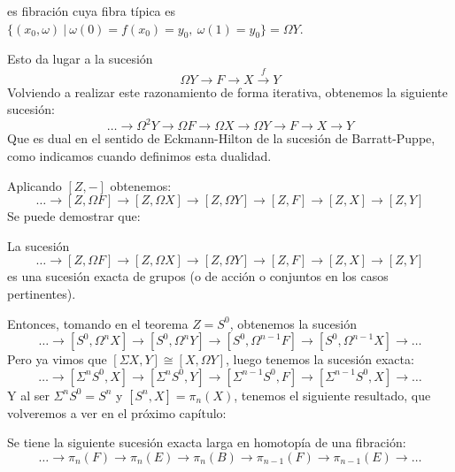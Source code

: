 es fibración cuya fibra típica es $\{(x_0, \omega) \ \vert \ \omega(0) = f(x_0) = y_0, \ \omega(1) = y_0 \} = \Omega Y$. \par
Esto da lugar a la sucesión
\[ \Omega Y \longrightarrow F \longrightarrow X \stackrel{f}{\longrightarrow} Y \]
Volviendo a realizar este razonamiento de forma iterativa, obtenemos la siguiente sucesión:
\[ \dots \longrightarrow \Omega^2 Y \longrightarrow \Omega F \longrightarrow \Omega X \longrightarrow \Omega Y \longrightarrow F \longrightarrow X \longrightarrow Y \]
Que es dual en el sentido de Eckmann-Hilton de la sucesión de Barratt-Puppe, como indicamos cuando definimos esta dualidad. \par Aplicando $[Z,-]$ obtenemos: 
\[ \dots  \longrightarrow [Z,\Omega F] \longrightarrow [Z, \Omega X] \longrightarrow [Z,\Omega Y] \longrightarrow [Z, F] \longrightarrow [Z, X] \longrightarrow [Z, Y] \]
Se puede demostrar que:
\begin{teor}
La sucesión
\[ \dots  \longrightarrow [Z,\Omega F] \longrightarrow [Z, \Omega X] \longrightarrow [Z,\Omega Y] \longrightarrow [Z, F] \longrightarrow [Z, X] \longrightarrow [Z, Y] \]
es una sucesión exacta de grupos (o de acción o conjuntos en los casos pertinentes).
\end{teor}
Entonces, tomando en el teorema $Z = S^0$, obtenemos la sucesión
\[ \dots \longrightarrow [S^0, \Omega^n X] \longrightarrow [S^0,\Omega^n Y] \longrightarrow [S^0, \Omega^{n-1} F] \longrightarrow [S^0, \Omega^{n-1} X] \longrightarrow \dots \]
Pero ya vimos que $[\Sigma X, Y] \cong [X, \Omega Y]$, luego tenemos la sucesión exacta:
\[ \dots  \longrightarrow [\Sigma^n S^0,  X] \longrightarrow [\Sigma^n S^0, Y] \longrightarrow [\Sigma^{n-1} S^0, F] \longrightarrow [\Sigma^{n-1}S^0,  X] \longrightarrow \dots \]
Y al ser $\Sigma^n S^0 = S^n$ y $[S^n, X] = \pi_n(X)$, tenemos el siguiente resultado, que volveremos a ver en el próximo capítulo:
\begin{teor}
Se tiene la siguiente sucesión exacta larga en homotopía de una fibración:
\[
\dots \longrightarrow \pi_n (F) \longrightarrow \pi_n (E) \longrightarrow \pi_n (B) \longrightarrow \pi_{n-1} (F) \longrightarrow \pi_{n-1} (E) \longrightarrow \dots 
\]
\end{teor}